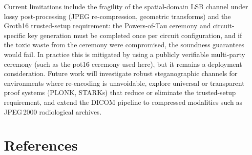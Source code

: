 \documentclass{jstarticle}
\begin{document}
Current limitations include the fragility of the spatial-domain LSB channel under lossy post-processing (JPEG re-compression, geometric transforms) and the Groth16 trusted-setup requirement: the Powers-of-Tau ceremony and circuit-specific key generation must be completed once per circuit configuration, and if the toxic waste from the ceremony were compromised, the soundness guarantees would fail.
In practice this is mitigated by using a publicly verifiable multi-party ceremony (such as the pot16 ceremony used here), but it remains a deployment consideration.
Future work will investigate robust steganographic channels for environments where re-encoding is unavoidable, explore universal or transparent proof systems (PLONK, STARKs) that reduce or eliminate the trusted-setup requirement, and extend the DICOM pipeline to compressed modalities such as JPEG\,2000 radiological archives.

\section*{References}
\printbibliography[heading=none]



\end{document}
